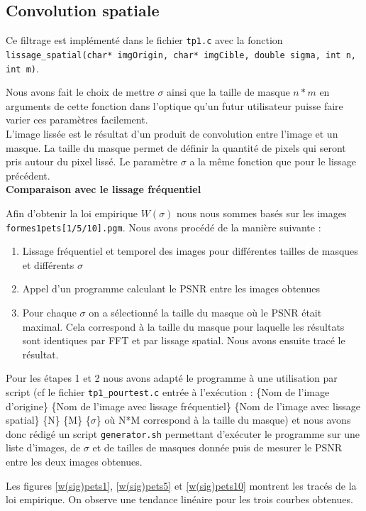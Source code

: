 \documentclass[paper=a4, fontsize=11pt]{scrartcl} %
\begin{document}
\newpage
\subsection{Convolution spatiale}
Ce filtrage est implémenté dans le fichier \texttt{tp1.c} avec la fonction \texttt{lissage\_spatial(char* imgOrigin, char* imgCible, double sigma, int n, int m)}.

Nous avons fait le choix de mettre $\sigma$ ainsi que la taille de masque $n*m$ en arguments de cette fonction dans l'optique qu'un futur utilisateur puisse faire varier ces paramètres facilement.\\

L'image lissée est le résultat d'un produit de convolution entre l'image et un masque. La taille du masque permet de définir la quantité de pixels qui seront pris autour du pixel lissé. Le paramètre $\sigma$ a la même fonction que pour le lissage précédent. \\

\textbf{Comparaison avec le lissage fréquentiel}

Afin d'obtenir la loi empirique $W(\sigma)$ nous nous sommes basés sur les images \texttt{formes1pets[1/5/10].pgm}. Nous avons procédé de la manière suivante :
\begin{enumerate}
\item Lissage fréquentiel et temporel des images pour différentes tailles de masques et différents $\sigma$
\item Appel d'un programme calculant le PSNR entre les images obtenues
\item Pour chaque $\sigma$ on a sélectionné la taille du masque où le PSNR était maximal. Cela correspond à la taille du masque pour laquelle les résultats sont identiques par FFT et par lissage spatial. Nous avons ensuite tracé le résultat.
\end{enumerate}
Pour les étapes 1 et 2 nous avons adapté le programme à une utilisation par script (cf le fichier \texttt{tp1\_pourtest.c} entrée à l'exécution : \{Nom de l'image d'origine\} \{Nom de l'image avec lissage fréquentiel\} \{Nom de l'image avec lissage spatial\} \{N\} \{M\} \{$\sigma$\} où N*M correspond à la taille du masque) et nous avons donc rédigé un script \texttt{generator.sh} permettant d'exécuter le programme sur une liste d'images, de $\sigma$ et de tailles de masques donnée puis de mesurer le PSNR entre les deux images obtenues. 

Les figures \ref{w(sig)pets1}, \ref{w(sig)pets5} et \ref{w(sig)pets10} montrent les tracés de la loi empirique.
On observe une tendance linéaire pour les trois courbes obtenues.
\end{document}
